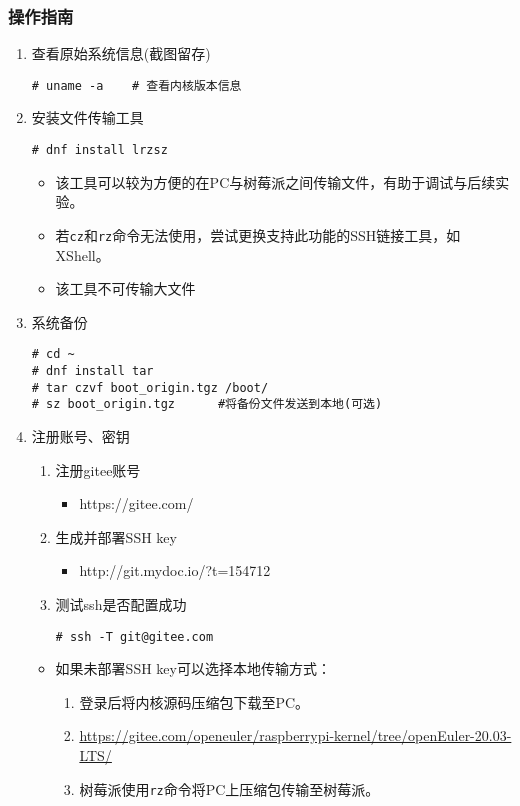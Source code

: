 \documentclass{article}
\begin{document}
\subsubsection{操作指南}
\begin{enumerate}
    \item 查看原始系统信息(截图留存)
\begin{lstlisting}
# uname -a    # 查看内核版本信息
\end{lstlisting}
    \item 安装文件传输工具
\begin{lstlisting}
# dnf install lrzsz
\end{lstlisting}
\begin{itemize}
    \item 该工具可以较为方便的在PC与树莓派之间传输文件，有助于调试与后续实验。
    \item 若\verb|cz|和\verb|rz|命令无法使用，尝试更换支持此功能的SSH链接工具，如XShell。
    \item 该工具不可传输大文件
\end{itemize}
    
    \item 系统备份
    \begin{lstlisting}
# cd ~
# dnf install tar
# tar czvf boot_origin.tgz /boot/
# sz boot_origin.tgz      #将备份文件发送到本地(可选)
    \end{lstlisting}

    \item 注册账号、密钥
    \begin{enumerate}
        \item 注册gitee账号
        \begin{itemize}
            \item https://gitee.com/
        \end{itemize}
        \item 生成并部署SSH key
        \begin{itemize}
            \item http://git.mydoc.io/?t=154712
        \end{itemize}
        \item 测试ssh是否配置成功
\begin{lstlisting}
# ssh -T git@gitee.com
\end{lstlisting}
    \end{enumerate}
\begin{itemize}
    \item 如果未部署SSH key可以选择本地传输方式：
    \begin{enumerate}
    \item 登录后将内核源码压缩包下载至PC。
    \item \url{https://gitee.com/openeuler/raspberrypi-kernel/tree/openEuler-20.03-LTS/} 
    \item 树莓派使用\verb|rz|命令将PC上压缩包传输至树莓派。
    \end{enumerate}
\end{itemize}


\end{enumerate}
\end{document}
